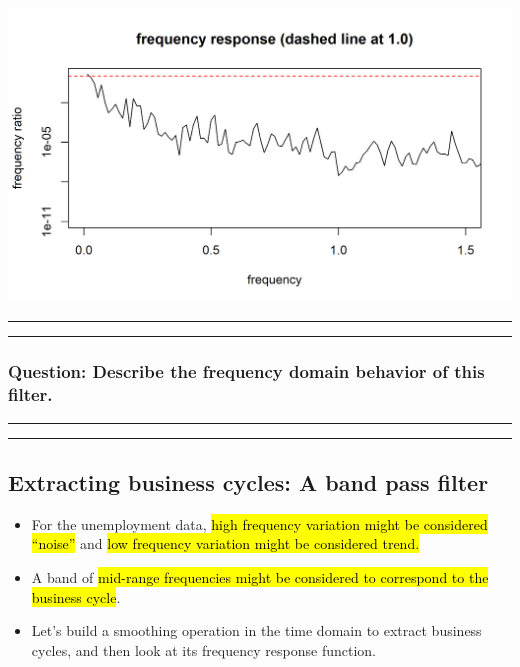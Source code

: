 \documentclass[]{article}
\begin{document}
\begin{center}\includegraphics{figure/intro-loess_transfer-1} \end{center}

\begin{center}\rule{0.5\linewidth}{\linethickness}\end{center}

\begin{center}\rule{0.5\linewidth}{\linethickness}\end{center}

\subsubsection{Question: Describe the frequency domain behavior of this
filter.}\label{question-describe-the-frequency-domain-behavior-of-this-filter.}

\begin{center}\rule{0.5\linewidth}{\linethickness}\end{center}

\begin{center}\rule{0.5\linewidth}{\linethickness}\end{center}

\subsection{Extracting business cycles: A band pass
filter}\label{extracting-business-cycles-a-band-pass-filter}

\begin{itemize}
\item
  For the unemployment data, \hl{high frequency variation might be
  considered ``noise''} and \hl{low frequency variation might be considered
  trend.}
\item
  A band of \hl{mid-range frequencies might be considered to correspond to
  the business cycle}.
\item
  Let's build a smoothing operation in the time domain to extract
  business cycles, and then look at its frequency response function.
\end{itemize}
\end{document}
